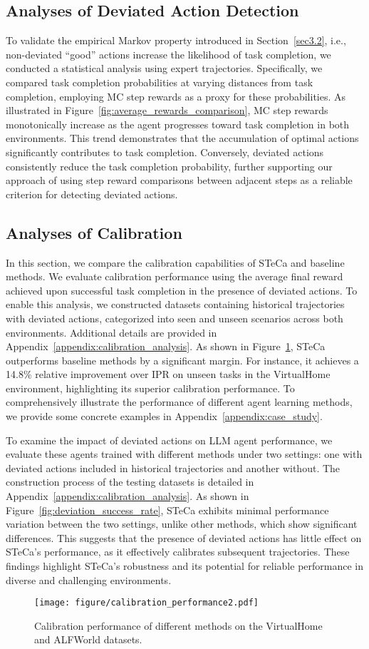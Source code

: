 \subsection{Analyses of Deviated Action Detection}
\label{statistic of step rewards}

To validate the empirical Markov property introduced in Section~\ref{sec3.2}, i.e., non-deviated ``good'' actions increase the likelihood of task completion, we conducted a statistical analysis using expert trajectories. Specifically, we compared task completion probabilities at varying distances from task completion, employing MC step rewards as a proxy for these probabilities. 
As illustrated in Figure~\ref{fig:average_rewards_comparison}, MC step rewards monotonically increase as the agent progresses toward task completion in both environments. This trend demonstrates that the accumulation of optimal actions significantly contributes to task completion. 
Conversely, deviated actions consistently reduce the task completion probability, further supporting our approach of using step reward comparisons between adjacent steps as a reliable criterion for detecting deviated actions.

\subsection{Analyses of Calibration}

In this section, we compare the calibration capabilities of STeCa and baseline methods. We evaluate calibration performance using the average final reward achieved upon successful task completion in the presence of deviated actions. To enable this analysis, we constructed datasets containing historical trajectories with deviated actions, categorized into seen and unseen scenarios across both environments. Additional details are provided in Appendix~\ref{appendix:calibration_analysis}.
As shown in Figure~\ref{fig:calibration_performance}, STeCa outperforms baseline methods by a significant margin. For instance, it achieves a 14.8\% relative improvement over IPR on unseen tasks in the VirtualHome environment, highlighting its superior calibration performance. To comprehensively illustrate the performance of different agent learning methods, we provide some concrete examples in Appendix~\ref{appendix:case_study}.


To examine the impact of deviated actions on LLM agent performance, we evaluate these agents trained with different methods under two settings: one with deviated actions included in historical trajectories and another without. The construction process of the testing datasets is detailed in Appendix~\ref{appendix:calibration_analysis}.
As shown in Figure~\ref{fig:deviation_success_rate}, STeCa exhibits minimal performance variation between the two settings, unlike other methods, which show significant differences. 
This suggests that the presence of deviated actions has little effect on STeCa's performance, as it effectively calibrates subsequent trajectories. 
These findings highlight STeCa's robustness and its potential for reliable performance in diverse and challenging environments.


\begin{figure}[t!]
  \texttt{[image: figure/calibration\_performance2.pdf]}
  \caption{Calibration performance of different methods on the VirtualHome and ALFWorld datasets.
  }
  \label{fig:calibration_performance}
\end{figure}

